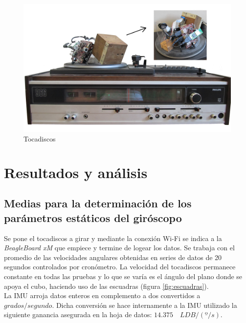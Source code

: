 \documentclass[main]{subfiles}
\begin{document}
\begin{figure}[h!]
	\centering
	\includegraphics[width=.9\textwidth]{./pics_gyro/tocadiscos.jpg}
	\caption{Tocadiscos}
	\label{fig:tocadiscos}
\end{figure}


\section{Resultados y análisis}
\subsection{Medias para la determinaci\'on de los par\'ametros est\'aticos del giróscopo}
Se pone el tocadiscos a girar y mediante la conexión Wi-Fi se indica a la \emph{BeagleBoard xM} que empiece y termine de logear los datos. Se trabaja con el promedio de las velocidades angulares obtenidas en series de datos de 20 segundos controlados por cronómetro. La velocidad del tocadiscos permanece constante en todas las pruebas y lo que se varía es el ángulo del plano donde se apoya el cubo, haciendo uso de las escuadras (figura \ref{fig:escuadras}).\\

La IMU arroja datos enteros en complemento a dos convertidos a $grados/segundo$. Dicha conversión se hace internamente a la IMU utilizado la siguiente ganancia asegurada en la hoja de datos: $14.375\quad LDB/(º/s)$.\\
\end{document}
